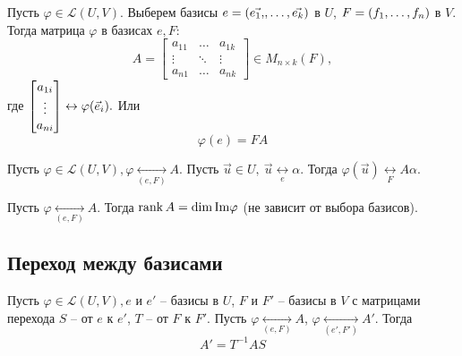 \begin{multicols}{2}
\begin{definition}{}{}
    Пусть $\varphi \in \mathcal{L}(U, V)$. Выберем базисы $e = (\vec{e_1,}, \ldots, \vec{e_k})$ в $U$, $F = (f_1, \ldots, f_n)$ в $V$. Тогда матрица $\varphi$ в базисах $e, F$:
    \[
        A = \begin{bmatrix}
            a_{11} & \ldots & a_{1k}\\
            \vdots & \ddots & \vdots\\
            a_{n1} & \ldots & a_{nk}
        \end{bmatrix} \in M_{n\times k}(F),
        \] 
        где $\begin{bmatrix}
            a_{1i}\\\vdots\\a_{ni}
        \end{bmatrix} \leftrightarrow \varphi(\vec{e}_i).$ Или
        \[
            \varphi(e) = FA
        \]
\end{definition}
\begin{proposition}{}{}
    Пусть $\varphi \in \mathcal{L}(U, V), \varphi \underset{(e,F)}{\leftrightarrow}A$. Пусть $\vec{u} \in U, \ \vec{u} \underset{e}{\leftrightarrow} \alpha$. Тогда $\varphi(\vec{u}) \underset{F}{\leftrightarrow} A\alpha$.
\end{proposition}
\begin{proposition}{}{}
    Пусть $\varphi \underset{(e,F)}{\leftrightarrow} A$. Тогда $\rank A = \dim \mathrm{Im} \varphi$ (не зависит от выбора базисов).
\end{proposition}
\subsection*{Переход между базисами}
\begin{proposition}{}{}
    Пусть $\varphi \in \mathcal{L}(U, V), e$ и $e'$ -- базисы в $U$, $F$ и $F'$ -- базисы в $V$ с матрицами перехода $S$ -- от $e$ к $e'$, $T$ -- от $F$ к $F'$. Пусть $\varphi \underset{(e,F)}{\leftrightarrow} A$, $\varphi \underset{(e',F')}{\leftrightarrow} A'$. Тогда 
    \[
        A' = T^{-1} AS
        \]
\end{proposition}

\end{multicols}
